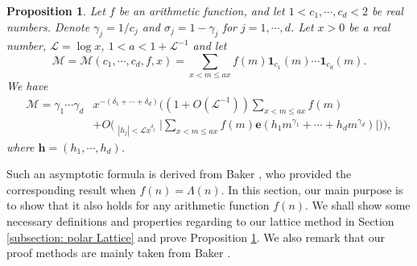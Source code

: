 \documentclass[12pt, reqno, twoside, letterpaper]{amsart}
\numberwithin{equation}{section}
\theoremstyle{customthm}
\newtheorem{proposition}[X]{Proposition}
\theoremstyle{customrem}
\begin{document}
\begin{proposition}\label{theorem: characterization} Let $f$
be an arithmetic function, and let $1<c_1,\cdots,c_d<2$ be real numbers.
Denote $\gamma_j=1/c_j$ and $\sigma_j=1-\gamma_j$ for $j=1,\cdots,d$.
Let $x>0$ be a real number, $\mathcal{L}= \log x$, $1<a<1+\mathcal{L}^{-1}$ and let
$$
\mathcal{M}=\mathcal{M}(c_1,\cdots,c_d,f,x)
=\sum_{x< m\leqslant ax}f(m)\mathbf{1}_{c_1}(m)\cdots \mathbf{1}_{c_d}(m).
$$
We have
\begin{align*}
\mathcal{M}=\gamma_1\cdots \gamma_d&x^{-(\delta_1+\cdots+\delta_d)}\Bigg(
(1+O(\mathcal{L}^{-1}))\sum_{x< m\leqslant ax}f(m)\\
&+O\Bigg(\mathop{\sum_{\boldsymbol{h}\in\mathbb{Z}^d\setminus\{\boldsymbol{0}\}}}
_{|h_j|<\mathcal{L}x^{\delta_j}}\Bigg|\sum_{x< m\leqslant ax}f(m)
\mathbf{e}\left(h_1m^{\gamma_1}+\cdots+h_dm^{\gamma_d}\right)\Bigg|\Bigg)\Bigg),
\end{align*}
where $\boldsymbol{h}=(h_1,\cdots,h_d)$.
\end{proposition}

Such an asymptotic formula is derived from Baker \cite[P. 351]{Baker2014},
who provided the corresponding result when $f(n)=\Lambda(n)$. In this section,
our main purpose is to show that it also holds for any arithmetic
function $f(n)$. We shall show some necessary definitions and properties regarding to our lattice method
in Section \ref{subsection: polar Lattice} and prove Proposition \ref{theorem: characterization}. We also remark that our proof methods are mainly taken from Baker \cite[Section 2]{Baker2014}.
\end{document}
